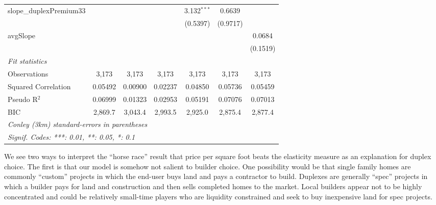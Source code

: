 \documentclass[12pt]{article}
\begin{document}
\begin{table}
\begin{tabular}{lcccccc}
   slope\_duplexPremium33  &                &          &                & 3.132$^{***}$ & 0.6639         &   \\   
                           &                &          &                & (0.5397)      & (0.9717)       &   \\   
   avgSlope                &                &          &                &               &                & 0.0684\\   
                           &                &          &                &               &                & (0.1519)\\   
   \midrule
   \emph{Fit statistics}\\
   Observations            & 3,173          & 3,173    & 3,173          & 3,173         & 3,173          & 3,173\\  
   Squared Correlation     & 0.05492        & 0.00900  & 0.02237        & 0.04850       & 0.05736        & 0.05459\\  
   Pseudo R$^2$            & 0.06999        & 0.01323  & 0.02953        & 0.05191       & 0.07076        & 0.07013\\  
   BIC                     & 2,869.7        & 3,043.4  & 2,993.5        & 2,925.0       & 2,875.4        & 2,877.4\\  
   \midrule \midrule
   \multicolumn{7}{l}{\emph{Conley (3km) standard-errors in parentheses}}\\
   \multicolumn{7}{l}{\emph{Signif. Codes: ***: 0.01, **: 0.05, *: 0.1}}\\
\end{tabular}
\par\endgroup
\end{table}

We see two ways to interpret the ``horse race'' result that price per square
foot beats the elasticity measure as an explanation for duplex choice. The
first is that our model is somehow not salient to builder choice. One possibility would be that single family homes are commonly ``custom'' projects in which the end-user buys land and pays a contractor to build. Duplexes are generally ``spec'' projects in which a builder pays for land and construction and then sells completed homes to the market. Local builders appear not to be highly concentrated and could be relatively small-time players who are liquidity constrained and seek to buy inexpensive land for spec projects.
\end{document}

